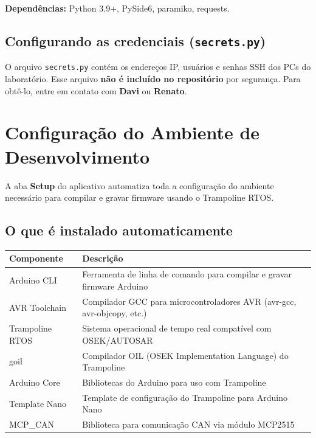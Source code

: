 \documentclass[12pt,a4paper]{article}
\begin{document}
\textbf{Dependências:} Python 3.9+, PySide6, paramiko, requests.

\subsection{Configurando as credenciais (\texttt{secrets.py})}

O arquivo \texttt{secrets.py} contém os endereços IP, usuários e senhas SSH dos PCs do laboratório. Esse arquivo \textbf{não é incluído no repositório} por segurança. Para obtê-lo, entre em contato com \textbf{Davi} ou \textbf{Renato}.

\section{Configuração do Ambiente de Desenvolvimento}

A aba \textbf{Setup} do aplicativo automatiza toda a configuração do ambiente necessário para compilar e gravar firmware usando o Trampoline RTOS.

\subsection{O que é instalado automaticamente}

\begin{center}
\begin{tabularx}{\textwidth}{lX}
  \toprule
  \textbf{Componente} & \textbf{Descrição} \\
  \midrule
  Arduino CLI       & Ferramenta de linha de comando para compilar e gravar firmware Arduino \\
  AVR Toolchain     & Compilador GCC para microcontroladores AVR (avr-gcc, avr-objcopy, etc.) \\
  Trampoline RTOS   & Sistema operacional de tempo real compatível com OSEK/AUTOSAR \\
  goil              & Compilador OIL (OSEK Implementation Language) do Trampoline \\
  Arduino Core      & Bibliotecas do Arduino para uso com Trampoline \\
  Template Nano     & Template de configuração do Trampoline para Arduino Nano \\
  MCP\_CAN          & Biblioteca para comunicação CAN via módulo MCP2515 \\
  \bottomrule
\end{tabularx}
\end{center}
\end{document}
